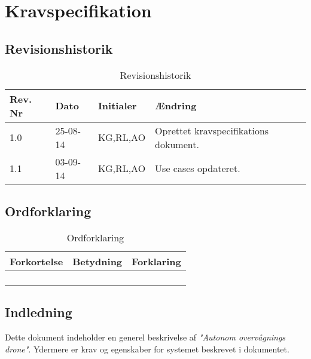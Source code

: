 \chapter{Kravspecifikation}

\section{Revisionshistorik}
\begin{table}[H]
	\centering
		\begin{tabular}{|p{2 cm}|p{2 cm}|p{3 cm}|p{6 cm}|} 
		\hline
			Rev. Nr & Dato		& Initialer 	& Ændring \\ \hline
			1.0 	& 25-08-14	& KG,RL,AO		& Oprettet kravspecifikations dokument.	\\ \hline
			1.1 	& 03-09-14	& KG,RL,AO		& Use cases opdateret.\\ \hline
		\end{tabular}
	\caption{Revisionshistorik}
\end{table}

\vspace{2cm}

\section{Ordforklaring}
\begin{table}[H]
	\centering
		\begin{tabular}{|p{4.5cm}|p{4.5 cm}|p{4.5 cm}|} 
		\hline
			Forkortelse & Betydning & Forklaring \\ \hline
			& & \\ \hline
			& & \\ \hline
			& & \\ \hline
			& & \\ \hline
		\end{tabular}
	\caption{Ordforklaring}
\end{table}

\vspace{4cm}

\section{Indledning}

Dette dokument indeholder en generel beskrivelse af \textit{"Autonom overvågnings drone"}. Ydermere er krav og egenskaber for systemet beskrevet i dokumentet.